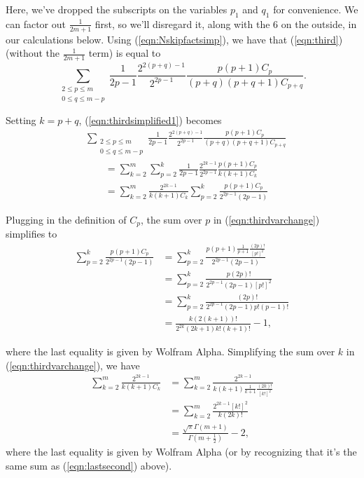 \documentclass[11pt]{article}
\theoremstyle{definition}
\theoremstyle{definition}
\theoremstyle{plain}
\theoremstyle{plain}
\theoremstyle{plain}
\theoremstyle{definition}
\theoremstyle{definition}
\begin{document}
{Here, we've dropped the subscripts on the variables $p_1$ and $q_1$ for convenience. We can factor out $\frac{1}{2m+1}$ first, so we'll disregard it, along with the 6 on the outside, in our calculations below. Using (\ref{eqn:Nskipfactsimp}), we have that (\ref{eqn:third}) (without the $\frac{1}{2m+1}$ term) is equal to
\begin{equation}\label{eqn:thirdsimplified1}
\sum\limits_{\substack{2\leq p \leq m \\ 0 \leq q \leq m-p}} \frac{1}{2p-1}\frac{2^{2(p+q)-1}}{2^{2p-1}}\frac{p(p+1)C_p}{(p+q)(p+q+1)C_{p+q}}.
\end{equation}

Setting $k = p + q$, (\ref{eqn:thirdsimplified1}) becomes
\begin{equation}\label{eqn:thirdvarchange}
\begin{aligned}
&\sum\limits_{\substack{2\leq p \leq m \\ 0 \leq q \leq m-p}} \frac{1}{2p-1}\frac{2^{2(p+q)-1}}{2^{2p-1}}\frac{p(p+1)C_p}{(p+q)(p+q+1)C_{p+q}} \\
&\qquad= \sum\limits_{k=2}^m\sum\limits_{p=2}^k \frac{1}{2p-1}\frac{2^{2k-1}}{2^{2p-1}}\frac{p(p+1)C_p}{k(k+1)C_k} \\
&\qquad= \sum\limits_{k=2}^m\frac{2^{2k-1}}{k(k+1)C_k}\sum\limits_{p=2}^k\frac{p(p+1)C_p}{2^{2p-1}(2p-1)}
\end{aligned}
\end{equation}

Plugging in the definition of $C_p$, the sum over $p$ in (\ref{eqn:thirdvarchange}) simplifies to
\begin{equation}\label{eqn:thirdinnersum}
\begin{aligned}
\sum\limits_{p=2}^k\frac{p(p+1)C_p}{2^{2p-1}(2p-1)} &= \sum\limits_{p=2}^k\frac{p(p+1)\frac{1}{p+1}\frac{(2p)!}{[p!]^2}}{2^{2p-1}(2p-1)} \\
&= \sum\limits_{p=2}^k\frac{p(2p)!}{2^{2p-1}(2p-1)[p!]^2} \\
&= \sum\limits_{p=2}^k\frac{(2p)!}{2^{2p-1}(2p-1)p!(p-1)!} \\
&= \frac{k(2(k+1))!}{2^{2k}(2k+1)k!(k+1)!}-1,
\end{aligned}
\end{equation}

where the last equality is given by Wolfram Alpha. Simplifying the sum over $k$ in (\ref{eqn:thirdvarchange}), we have
\begin{equation}\label{eqn:thirdoutersum}
\begin{aligned}
\sum\limits_{k=2}^m\frac{2^{2k-1}}{k(k+1)C_k} &= \sum\limits_{k=2}^m\frac{2^{2k-1}}{k(k+1)\frac{1}{k+1}\frac{(2k)!}{[k!]^2}} \\
&= \sum\limits_{k=2}^m \frac{2^{2k-1}[k!]^2}{k(2k)!} \\
&= \frac{\sqrt{\pi}\Gamma(m+1)}{\Gamma(m+\frac{1}{2})}-2,
\end{aligned}
\end{equation}
where the last equality is given by Wolfram Alpha (or by recognizing that it's the same sum as (\ref{eqn:lastsecond}) above).

}
\end{document}
